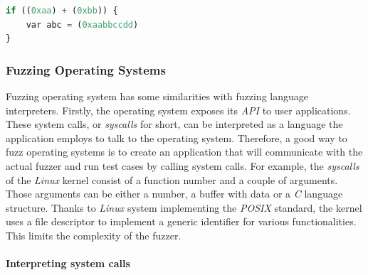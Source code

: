\begin{minipage}{\linewidth}
\begin{lstlisting}[language=python,caption={Generated program from syntax tree.},label={lst:gensrc}]
if ((0xaa) + (0xbb)) {
    var abc = (0xaabbccdd)
}    
\end{lstlisting}    
\end{minipage}


\subsubsection{Fuzzing Operating Systems}

Fuzzing operating system has some similarities with fuzzing language interpreters. Firstly, the operating system exposes its \textit{API} to user applications. These system calls, or \textit{syscalls} for short, can be interpreted as a language the application employs to talk to the operating system. Therefore, a good way to fuzz operating systems is to create an application that will communicate with the actual fuzzer and run test cases by calling system calls. For example, the \textit{syscalls} of the \textit{Linux} kernel consist of a function number and a couple of arguments. Those arguments can be either a number, a buffer with data or a \textit{C} language structure. Thanks to \textit{Linux} system implementing the \textit{POSIX} standard, the kernel uses a file descriptor to implement a generic identifier for various functionalities. This limits the complexity of the fuzzer. 

\paragraph{Interpreting system calls}
 

